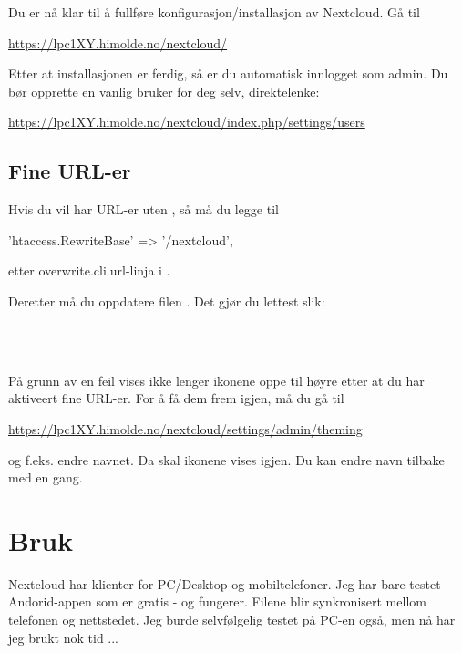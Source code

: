 Du er nå klar til å fullføre konfigurasjon/installasjon av Nextcloud. Gå til

\url{https://lpc1XY.himolde.no/nextcloud/}

Etter at installasjonen er ferdig, så er du automatisk innlogget som admin. 
Du bør opprette en vanlig bruker for deg selv, direktelenke:

\url{https://lpc1XY.himolde.no/nextcloud/index.php/settings/users}

\subsection{Fine URL-er}

Hvis du vil har URL-er uten , så må du legge til

\begin{filedata}
  'htaccess.RewriteBase' => '/nextcloud',
\end{filedata}

etter overwrite.cli.url-linja i .

Deretter må du oppdatere filen . Det gjør du lettest slik:

\\
\\

På grunn av en feil vises ikke lenger ikonene oppe til høyre etter at du har aktiveert
fine URL-er. For å få dem frem igjen, må du gå til

\url{https://lpc1XY.himolde.no/nextcloud/settings/admin/theming}

og f.eks. endre navnet. Da skal ikonene vises igjen. Du kan endre navn tilbake med en gang.

\section{Bruk}

Nextcloud har klienter for PC/Desktop og mobiltelefoner. Jeg har bare testet Andorid-appen
som er gratis - og fungerer. Filene blir synkronisert mellom telefonen og nettstedet. Jeg 
burde selvfølgelig testet på PC-en også, men nå har jeg brukt nok tid ...